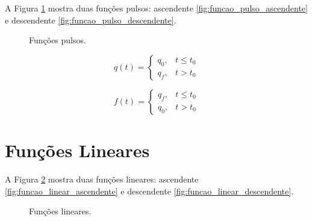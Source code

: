         A Figura \ref{fig:funcoes_pulsos} mostra duas funções pulsos: ascendente \ref{fig:funcao_pulso_ascendente} e descendente \ref{fig:funcao_pulso_descendente}.
    
        \begin{figure}[htb]
            \centering
            \caption{Funções pulsos.} \label{fig:funcoes_pulsos}
        \end{figure}
        
        \begin{equation} \label{eq:funcao_pulso_ascendente}
            q(t) =
            \begin{cases}
                q_0 ,& t \leq t_0 \\
                q_f ,& t > t_0
            \end{cases}
        \end{equation}
        
        \begin{equation} \label{eq:funcao_pulso_descendente}
            f(t) =
            \begin{cases}
                q_f ,& t \leq t_0 \\
                q_0 ,& t > t_0
            \end{cases}
        \end{equation}
    
    \section{Funções Lineares} \label{sec:funcoes_lineares}
    
        A Figura \ref{fig:funcoes_lineares} mostra duas funções lineares: ascendente \ref{fig:funcao_linear_ascendente} e descendente \ref{fig:funcao_linear_descendente}.
    
        \begin{figure}[htb]
            \centering
            \caption{Funções lineares.} \label{fig:funcoes_lineares}
        \end{figure}
        

